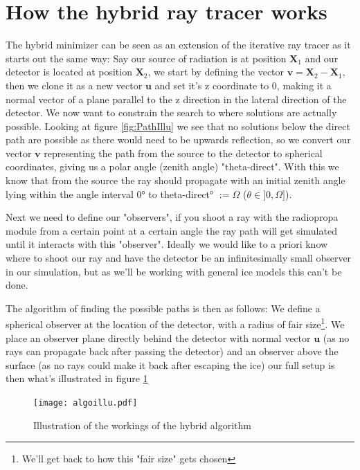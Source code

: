 \section{How the hybrid ray tracer works}
The hybrid minimizer can be seen as an extension of the iterative ray tracer as
it starts out the same way: Say our source of radiation is at position
$\mathbf{X}_1$ and our detector is located at position $\mathbf{X}_2$, we start
by defining the vector $\mathbf{v} = \mathbf{X}_2 - \mathbf{X}_1$, then we
clone it as a new vector $\mathbf{u}$ and set it's z coordinate to 0, making it a normal
vector of a plane parallel to the z direction in the lateral direction of the detector. 
We now want to constrain the search to where solutions are actually possible. 
Looking at figure \ref{fig:PathIllu}
we see that no solutions below the direct path are possible as there would need
to be upwards reflection, so we convert our vector $\mathbf{v}$ representing
the path from the source to the detector to spherical coordinates, giving us a
polar angle (zenith angle) "theta-direct". With this we know that from the source
the ray should propagate with an initial zenith angle lying within the angle interval
0° to theta-direct° $:= \Omega$ ($\theta \in ]0,\Omega]$).

Next we need to define our "observers", if you shoot a ray with the radiopropa
module from a certain point at a certain angle the ray path will get simulated
until it interacts with this "observer".  Ideally we would like to a priori
know where to shoot our ray and have the detector be an infinitesimally small
observer in our simulation, but as we'll be working with general ice models
this can't be done.

The algorithm of finding the possible paths is then as follows: We define a
spherical observer at the location of the detector, with a radius of fair
size\footnote{We'll get back to how this "fair size" gets chosen}.  We place an observer plane directly
behind the detector with normal vector $\mathbf{u}$ (as no rays can propagate
back after passing the detector) and an observer above the surface (as no rays
could make it back after escaping the ice) our full setup is then what's
illustrated in figure \ref{fig:Illustration of hybrid algorithm}

\begin{figure}
  \centering
  \texttt{[image: algoillu.pdf]}
  \caption{Illustration of the workings of the hybrid algorithm}
  \label{fig:Illustration of hybrid algorithm}
\end{figure}

